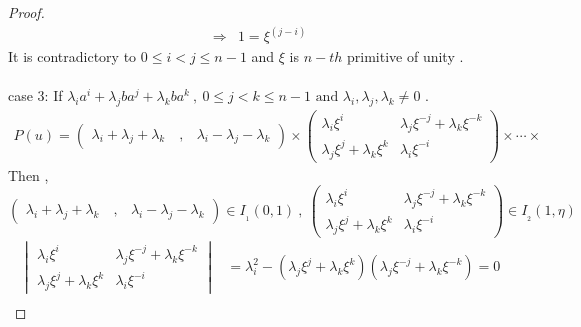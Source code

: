 \documentclass{article}
\begin{document}
\begin{proof}
\begin{align*}
\Rightarrow&1=\xi^{\scriptscriptstyle(j-i)}
\end{align*}
It is contradictory to $0\leq i<j\leq n-1$ and $\xi$ is $n-th$ primitive of unity .\\
\quad\\
case 3: If  $\lambda_{i}a^{\scriptscriptstyle i}+\lambda_{j}ba^{\scriptscriptstyle j}+\lambda_{k}ba^{\scriptscriptstyle k}\:,\:0\leq j<k\leq n-1\text{ and } \lambda_i,\lambda_j,\lambda_k\neq0$ . 
\begin{align*}
    P(u)=\begin{pmatrix}
          \lambda_i+\lambda_j+\lambda_k\quad,&\lambda_i-\lambda_j-\lambda_k
        \end{pmatrix}
        \times
        \begin{pmatrix}
             \lambda_i\xi^{\scriptscriptstyle i}&\lambda_j\xi^{\scriptscriptstyle-j}+\lambda_k\xi^{\scriptscriptstyle-k}\\
            \lambda_j\xi^{\scriptscriptstyle j}+\lambda_k\xi^{\scriptscriptstyle k}&\lambda_i\xi^{\scriptscriptstyle-i}
        \end{pmatrix}
        \times\cdots\times
\end{align*}
Then ,\\
    $\begin{pmatrix}
           \lambda_i+\lambda_j+\lambda_k\quad,&\lambda_i-\lambda_j-\lambda_k 
        \end{pmatrix}\in{I_{_1}(0,1)}
        \:,\:
        \begin{pmatrix}
            \lambda_i\xi^{\scriptscriptstyle i}&\lambda_j\xi^{\scriptscriptstyle-j}+\lambda_k\xi^{\scriptscriptstyle-k}\\
            \lambda_j\xi^{\scriptscriptstyle j}+\lambda_k\xi^{\scriptscriptstyle k}&\lambda_i\xi^{\scriptscriptstyle-i}
        \end{pmatrix}\in{I_{_2}(1,\eta)}$\\
        \begin{align*}
         \begin{vmatrix}
            \lambda_i\xi^{\scriptscriptstyle i}&\lambda_j\xi^{\scriptscriptstyle-j}+\lambda_k\xi^{\scriptscriptstyle-k}\\
            \lambda_j\xi^{\scriptscriptstyle j}+\lambda_k\xi^{\scriptscriptstyle k}&\lambda_i\xi^{\scriptscriptstyle-i}
        \end{vmatrix}&=\lambda_i^{\scriptscriptstyle2}-(\lambda_j\xi^{\scriptscriptstyle j}+\lambda_k\xi^{\scriptscriptstyle k})(\lambda_j\xi^{\scriptscriptstyle-j}+\lambda_k\xi^{\scriptscriptstyle-k})=0\\

\end{align*}
\end{proof}
\end{document}
